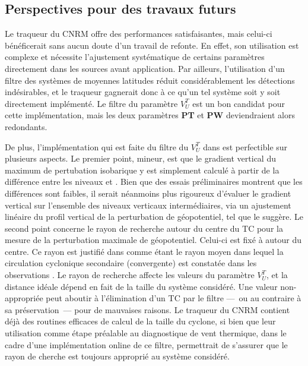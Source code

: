 \documentclass[../main.tex]{subfiles}
\begin{document}
\subsection*{Perspectives pour des travaux futurs}

Le traqueur du CNRM offre des performances satisfaisantes, mais celui-ci bénéficerait sans aucun doute d'un travail de refonte. En effet, son utilisation est
complexe et nécessite l'ajustement systématique de certains paramètres directement dans les sources avant application. Par ailleurs, l'utilisation d'un filtre
des systèmes de moyennes latitudes réduit considérablement les détections indésirables, et le traqueur gagnerait donc à ce qu'un tel système soit y soit
directement implémenté. Le filtre du paramètre $V_U^T$ est un bon candidat pour cette implémentation, mais les deux paramètres \textbf{PT} et \textbf{PW}
deviendraient alors redondants.


De plus, l'implémentation qui est faite du filtre du $V_U^T$ dans \textcite{dulac_assessing_2023} est perfectible sur plusieurs aspects. Le premier point,
mineur, est que le gradient vertical du maximum de pertubation isobarique y est simplement calculé à partir de la différence entre les niveaux  et
. Bien que des essais préliminaires montrent que les différences sont faibles, il serait néanmoins plus rigoureux d'évaluer le gradient vertical sur
l'ensemble des niveaux verticaux intermédiaires, via un ajustement linéaire du profil vertical de la perturbation de géopotentiel, tel que
\textcite{hart_cyclone_2003} le suggère. Le second point concerne le rayon de recherche autour du centre du TC pour la mesure de la perturbation maximale de
géopotentiel. Celui-ci est fixé à  autour du centre. Ce rayon est justifié dans \textcite{hart_cyclone_2003} comme étant le rayon moyen dans lequel la
circulation cyclonique secondaire (convergente) est constatée dans les observations \parencite{frank_structure_1977}. Le rayon de recherche affecte les valeurs
du paramètre $V_U^T$, et la distance idéale dépend en fait de la taille du système considéré. Une valeur non-appropriée peut aboutir à l'élimination d'un TC par
le filtre ---~ou au contraire à sa préservation~--- pour de mauvaises raisons. Le traqueur du CNRM contient déjà des routines efficaces de calcul de la taille
du cyclone, si bien que leur utilisation comme étape préalable au diagnostique de vent thermique, dans le cadre d'une implémentation online de ce filtre,
permettrait de s'assurer que le rayon de cherche est toujours approprié au système considéré.
\end{document}
